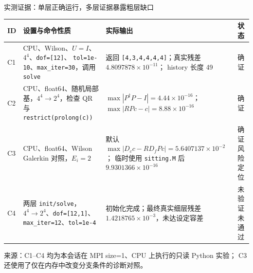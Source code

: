 \documentclass[UTF8,aspectratio=169,11pt]{ctexbeamer}
\newcommand{\source}[1]{%
  \vspace{0.06em}\par{\raggedright\scriptsize\color{muted}来源：#1\par}}
\newcommand{\verified}{\textcolor{evidence}{确证}}
\newcommand{\unverified}{\textcolor{warn}{未验证}}
\begin{document}
\begin{frame}[t]{实测证据：单层正确运行，多层证据暴露粗层缺口}
  \begin{center}
    \scriptsize
    \begin{tabular}{@{}P{0.07\textwidth}P{0.30\textwidth}P{0.40\textwidth}P{0.13\textwidth}@{}}
      \toprule
      ID & 设置与命令性质 & 实际输出 & 状态 \\
      \midrule
      C1 & CPU、Wilson、$U=I$、$4^4$、\texttt{dof=[12]}、
      \texttt{tol=1e-10}、\texttt{max\_iter=30}，调用 \texttt{solve} & 返回
      \texttt{[4,3,4,4,4,4]}；真实残差 $4.8097878\times10^{-11}$；
      history 长度 49 & \verified{} \\
      C2 & CPU、float64、随机局部基，$4^4\to2^4$，检查
      QR 与 \texttt{restrict(prolong(c))} & $\max|P^\dagger P-I|=4.44\times10^{-16}$；
      $\max|RPc-c|=8.88\times10^{-16}$ & \verified{} \\
      C3 & CPU、float64、Wilson Galerkin 对照，$E_i=2$ & 默认
      $\max|D_c c-RD_fPc|=5.6407137\times10^{-2}$；
      临时使用 \texttt{sitting.M} 后 $9.9301366\times10^{-16}$ & \verified{} 风险定位 \\
      C4 & 两层 \texttt{init/solve}，$4^4\to2^4$、\texttt{dof=[12,1]}、
      \texttt{max\_iter=12}、\texttt{tol=1e-4} & 初始化完成；最终真实细层残差
      $1.4218765\times10^{-3}$，未达设定容差 & \unverified{} 未通过 \\
      \bottomrule
    \end{tabular}
  \end{center}
  \source{C1--C4 均为本会话在 MPI size=1、CPU 上执行的只读 Python 实验；
  C3 还使用了仅在内存中改变分支条件的诊断对照。}
\end{frame}
\end{document}
